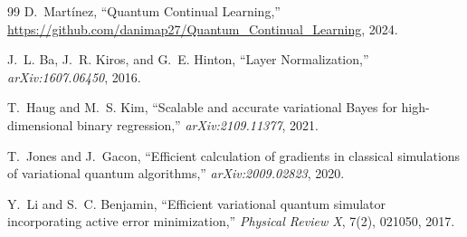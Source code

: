 \documentclass[a4paper,nopdfoutputerror]{quantumarticle}
\begin{document}
\begin{thebibliography}{99}
D.~Mart\'inez,
``Quantum Continual Learning,''
\url{https://github.com/danimap27/Quantum_Continual_Learning}, 2024.

J.~L. Ba, J.~R. Kiros, and G.~E. Hinton,
``Layer Normalization,''
\emph{arXiv:1607.06450}, 2016.

T.~Haug and M.~S. Kim,
``Scalable and accurate variational Bayes for high-dimensional binary regression,''
\emph{arXiv:2109.11377}, 2021.

T.~Jones and J.~Gacon,
``Efficient calculation of gradients in classical simulations of variational quantum algorithms,''
\emph{arXiv:2009.02823}, 2020.

Y.~Li and S.~C. Benjamin,
``Efficient variational quantum simulator incorporating active error minimization,''
\emph{Physical Review X}, 7(2), 021050, 2017.
\end{thebibliography}
\end{document}
